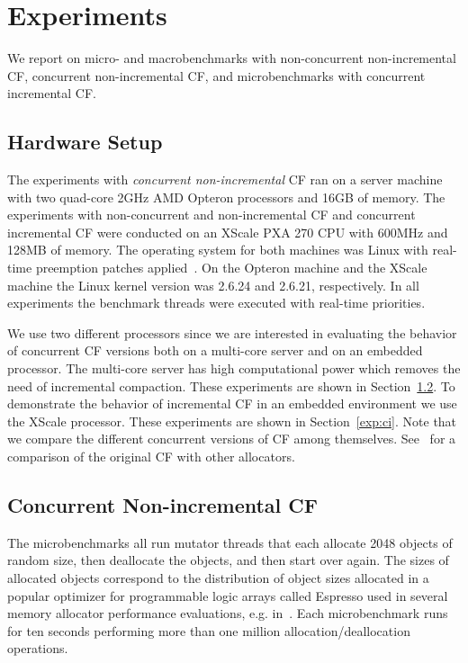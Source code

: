 \documentclass{amsart}
\begin{document}
\section{Experiments}
\label{sec:exp}

We report on micro- and macrobenchmarks with non-concurrent non-incremental CF,
concurrent non-incremental CF, and microbenchmarks with concurrent incremental
CF.

\subsection{Hardware Setup}

The experiments with {\em{concurrent non-incremental}} CF ran on a server machine with
two quad-core 2GHz AMD Opteron processors and 16GB of memory. The experiments
with non-concurrent and non-incremental CF and concurrent incremental CF were
conducted on an XScale PXA 270 CPU with 600MHz and 128MB of memory.  The
operating system for both machines was Linux with real-time preemption patches
applied~\cite{RT}.  On the Opteron machine and the XScale machine the Linux
kernel version was 2.6.24 and 2.6.21, respectively.  In all experiments the
benchmark threads were executed with real-time priorities.

{We use two different processors since we are interested in
  evaluating the behavior of concurrent CF versions both on a
  multi-core server and on an embedded processor. The multi-core
  server has high computational power which removes the need of
  incremental compaction. These experiments are shown in
  Section~\ref{exp:cni}. To demonstrate the behavior of incremental CF
  in an embedded environment
  we use the XScale processor. These experiments are shown in
  Section~\ref{exp:ci}. Note that we compare the different concurrent versions of CF among themselves. See~\cite{USENIX08} for a comparison of the original CF with other allocators.}



\subsection{Concurrent Non-incremental CF}\label{exp:cni}

The microbenchmarks all run mutator threads that each allocate 2048
objects of random size, then deallocate the objects, and then start
over again.  The sizes of allocated objects correspond to the
distribution of object sizes allocated in a popular optimizer for
programmable logic arrays called Espresso used in several memory
allocator performance evaluations, e.g. in~\cite{Joh1}.  Each
microbenchmark runs for ten seconds performing more than one million
allocation/deallocation operations.
\end{document}
